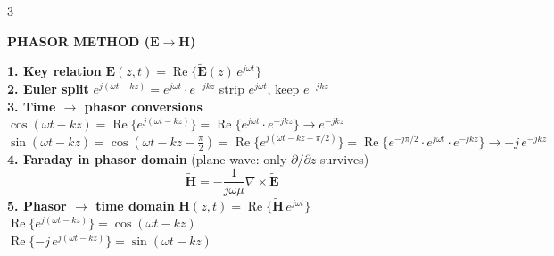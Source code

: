 \documentclass[6pt,letterpaper]{article}
\newcommand{\shead}[3]{%
  \noindent\colorbox{#1}{\parbox{\dimexpr\linewidth-2\fboxsep\relax}%
  {\color{#2}\bfseries\fontsize{6}{7}\selectfont #3}}\vspace{0.5pt}}
\begin{document}
\begin{multicols}{3}
\vspace{2pt}
\shead{pinkbg}{pink}{PHASOR METHOD ($\mathbf{E}\to\mathbf{H}$)}
\begin{ebox}
\textbf{\color{pink}1. Key relation} \quad $\mathbf{E}(z,t)=\operatorname{Re}\{\tilde{\mathbf{E}}(z)\,e^{j\omega t}\}$\\
\textbf{\color{pink}2. Euler split} \quad $e^{j(\omega t-kz)}=e^{j\omega t}\cdot e^{-jkz}$ \quad strip $e^{j\omega t}$, keep $e^{-jkz}$\\[3pt]
\textbf{\color{pink}3. Time $\to$ phasor conversions}\\
$\cos(\omega t-kz)=\operatorname{Re}\{e^{j(\omega t-kz)}\}=\operatorname{Re}\{e^{j\omega t}\cdot e^{-jkz}\}\to e^{-jkz}$\\
$\sin(\omega t-kz)=\cos(\omega t-kz-\tfrac{\pi}{2})=\operatorname{Re}\{e^{j(\omega t-kz-\pi/2)}\}=\operatorname{Re}\{e^{-j\pi/2}\cdot e^{j\omega t}\cdot e^{-jkz}\}\to -j\,e^{-jkz}$\\[3pt]
\textbf{\color{pink}4. Faraday in phasor domain} \quad (plane wave: only $\partial/\partial z$ survives)
\[\tilde{\mathbf{H}} = -\frac{1}{j\omega\mu}\nabla\times\tilde{\mathbf{E}}\]
\textbf{\color{pink}5. Phasor $\to$ time domain} \quad $\mathbf{H}(z,t)=\operatorname{Re}\{\tilde{\mathbf{H}}\,e^{j\omega t}\}$\\
$\operatorname{Re}\{e^{j(\omega t-kz)}\}=\cos(\omega t-kz)$\\
$\operatorname{Re}\{-j\,e^{j(\omega t-kz)}\}=\sin(\omega t-kz)$
\end{ebox}


\end{multicols}
\end{document}
